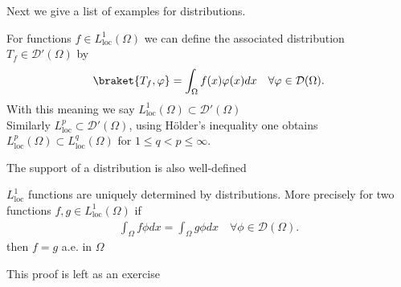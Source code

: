 Next we give a list of examples for distributions.
\begin{example}
  For functions $f \in  L^{1}_{\text{loc}}(\Omega ) $  we can define the associated distribution $T_f \in  \mathcal{D}'(\Omega )$ by 
  \begin{align*}
    \braket{T_f,\phi } = \int_\Omega  f(x)\phi(x) dx \quad \forall \phi  \in \mathcal{D}(\Omega )
  .\end{align*}
  With this meaning we say $L_{\text{loc}}^{1}(\Omega ) \subset \mathcal{D}'(\Omega )  $\\[1ex]
  Similarly $L^{p}_{\text{loc}} \subset  \mathcal{D}'(\Omega ) $, using Hölder's inequality one obtains
  $L_{\text{loc}}^{p}(\Omega ) \subset L_{\text{loc}}^{q}(\Omega )   $ for $1\leq q<p\leq \infty$.
\end{example}
\begin{remark}
 The support of a distribution is also well-defined 
\end{remark}
\begin{theorem}
  $L^{1}_{\text{loc}} $ functions are uniquely determined by distributions. More precisely 
  for two functions $f,g \in  L_{\text{loc}}^{1}(\Omega ) $  if 
  \begin{align*}
    \int_\Omega  f \phi dx = \int_\Omega  g \phi dx \quad \forall \phi  \in \mathcal{D}(\Omega )
  .\end{align*}
  then $f = g$ a.e. in $\Omega $
\end{theorem}
 This proof is left as an exercise  

